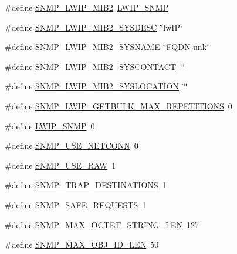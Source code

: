\begin{DoxyCompactItemize}
\item 
\#define \hyperlink{group__snmp__opts_gaab667d48f48ee89f8bdbc7f134e6037d}{S\+N\+M\+P\+\_\+\+L\+W\+I\+P\+\_\+\+M\+I\+B2}~\hyperlink{group__snmp__opts_gaf4900859dc53f19f5f67cc34e48ad68c}{L\+W\+I\+P\+\_\+\+S\+N\+MP}
\item 
\#define \hyperlink{group__snmp__opts_gae93a105b421a2ca91e862da5087cec73}{S\+N\+M\+P\+\_\+\+L\+W\+I\+P\+\_\+\+M\+I\+B2\+\_\+\+S\+Y\+S\+D\+E\+SC}~\char`\"{}lw\+IP\char`\"{}
\item 
\#define \hyperlink{group__snmp__opts_ga80ba46f9517a51b5477f13082b2bcf98}{S\+N\+M\+P\+\_\+\+L\+W\+I\+P\+\_\+\+M\+I\+B2\+\_\+\+S\+Y\+S\+N\+A\+ME}~\char`\"{}F\+Q\+DN-\/unk\char`\"{}
\item 
\#define \hyperlink{group__snmp__opts_ga1a57501c615b630d363e0af1a504e683}{S\+N\+M\+P\+\_\+\+L\+W\+I\+P\+\_\+\+M\+I\+B2\+\_\+\+S\+Y\+S\+C\+O\+N\+T\+A\+CT}~\char`\"{}\char`\"{}
\item 
\#define \hyperlink{group__snmp__opts_ga311cec98c8f7e4851d325fffe96cf8d9}{S\+N\+M\+P\+\_\+\+L\+W\+I\+P\+\_\+\+M\+I\+B2\+\_\+\+S\+Y\+S\+L\+O\+C\+A\+T\+I\+ON}~\char`\"{}\char`\"{}
\item 
\#define \hyperlink{group__snmp__opts_ga5a24152aa5f3c2837b9a3145aa3c59f3}{S\+N\+M\+P\+\_\+\+L\+W\+I\+P\+\_\+\+G\+E\+T\+B\+U\+L\+K\+\_\+\+M\+A\+X\+\_\+\+R\+E\+P\+E\+T\+I\+T\+I\+O\+NS}~0
\item 
\#define \hyperlink{group__snmp__opts_gaf4900859dc53f19f5f67cc34e48ad68c}{L\+W\+I\+P\+\_\+\+S\+N\+MP}~0
\item 
\#define \hyperlink{group__snmp__opts_gaf02e8b4b69e99df784e9953401477078}{S\+N\+M\+P\+\_\+\+U\+S\+E\+\_\+\+N\+E\+T\+C\+O\+NN}~0
\item 
\#define \hyperlink{group__snmp__opts_ga8c93f4260af2eb3c50d4bc603f716f1f}{S\+N\+M\+P\+\_\+\+U\+S\+E\+\_\+\+R\+AW}~1
\item 
\#define \hyperlink{group__snmp__opts_ga692343b0cc555c302fd713003d4f8a08}{S\+N\+M\+P\+\_\+\+T\+R\+A\+P\+\_\+\+D\+E\+S\+T\+I\+N\+A\+T\+I\+O\+NS}~1
\item 
\#define \hyperlink{group__snmp__opts_ga95e39047b9bcb385780b06b35af49261}{S\+N\+M\+P\+\_\+\+S\+A\+F\+E\+\_\+\+R\+E\+Q\+U\+E\+S\+TS}~1
\item 
\#define \hyperlink{group__snmp__opts_gae50cdd09697aa54a8b9f26432ac55ac2}{S\+N\+M\+P\+\_\+\+M\+A\+X\+\_\+\+O\+C\+T\+E\+T\+\_\+\+S\+T\+R\+I\+N\+G\+\_\+\+L\+EN}~127
\item 
\#define \hyperlink{group__snmp__opts_ga3ad9d293f90e3c885c4e3263a9064a41}{S\+N\+M\+P\+\_\+\+M\+A\+X\+\_\+\+O\+B\+J\+\_\+\+I\+D\+\_\+\+L\+EN}~50

\end{DoxyCompactItemize}
